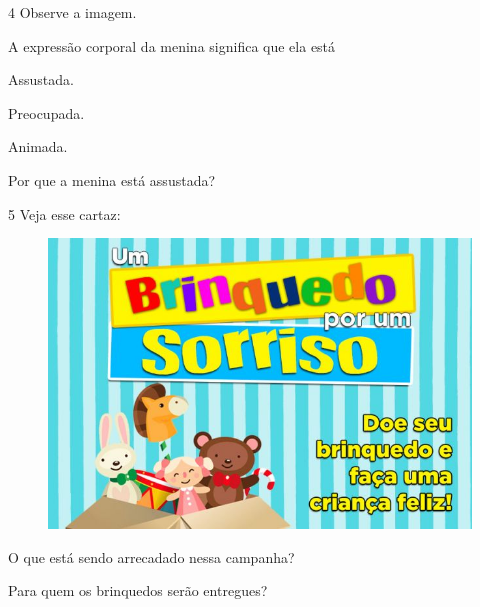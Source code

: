 \pagebreak
\num{4} Observe a imagem.

\begin{escolha}
\item A expressão corporal da menina significa que ela está

\begin{boxlist}
 Assustada.

 Preocupada.

 Animada.
\end{boxlist}

\item Por que a menina está assustada?


\end{escolha}

\pagebreak
\num{5} Veja esse cartaz:

\begin{figure}[htpb!]
\centering
\includegraphics[width=\textwidth]{media/image132.jpeg}
\end{figure}


\begin{escolha}
\item O que está sendo arrecadado nessa campanha?


\item Para quem os brinquedos serão entregues?

\end{escolha}

